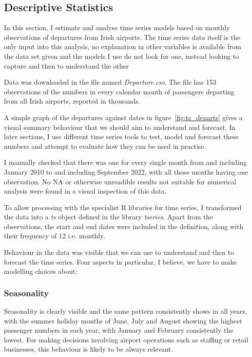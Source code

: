 \documentclass[conference]{IEEEtran}
\begin{document}
\subsection{Descriptive Statistics}

In this section, I estimate and analyse time series models based on monthly observations of departures from Irish airports.  The time series data itself is the only input into this analysis, no explanation in other variables is available from the data set given and the models I use do not look for one, instead looking to capture and then to understand the other

Data was downloaded in the file named \textit{Departure.csv}.  The file has 153 observations of the numbers in every calendar month of passengers departing from all Irish airports, reported in thousands.  

A simple graph of the departures against dates in figure~\ref{fig:ts_departs} gives a visual summary behaviour that we should aim to understand and forecast. In later sections, I use different time series tools to test, model and forecast these numbers and attempt to evaluate how they can be used in practise.  

I manually checked that there was one for every single month from and including January 2010 to and including September 2022, with all those months having one observation. No NA or otherwise unreadible results not suitable for numerical analysis were found in a visual inspection of this data. 

To allow processing with the specialist R libraries for time series, I transformed the data into a \textit{ts} object defined in the library \textit{tseries}.  Apart from the observations, the start and end dates were included in the definition, along with their frequency of 12 i.e. monthly.  


Behaviour in the data was visible that we can use to understand and then to forecast the time series.  Four aspects in particular, I believe, we have to make modelling choices about: 

\subsubsection{Seasonality}Seasonality is clearly visible and the same pattern consistently shows in all years, with the summer holiday months of June, July and August showing the highest passenger numbers in each year, with January and February consistently the lowest.  For making decisions involving airport operations such as staffing or retail businesses, this behaviour is likely to be always relevant.  
\end{document}
